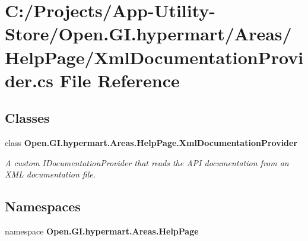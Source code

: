 \section{C\+:/\+Projects/\+App-\/\+Utility-\/\+Store/\+Open.G\+I.\+hypermart/\+Areas/\+Help\+Page/\+Xml\+Documentation\+Provider.cs File Reference}
\label{_xml_documentation_provider_8cs}
\subsection*{Classes}
\begin{DoxyCompactItemize}
\item 
class \textbf{ Open.\+G\+I.\+hypermart.\+Areas.\+Help\+Page.\+Xml\+Documentation\+Provider}
\begin{DoxyCompactList}\small\item\em A custom I\+Documentation\+Provider that reads the A\+PI documentation from an X\+ML documentation file. \end{DoxyCompactList}\end{DoxyCompactItemize}
\subsection*{Namespaces}
\begin{DoxyCompactItemize}
\item 
namespace \textbf{ Open.\+G\+I.\+hypermart.\+Areas.\+Help\+Page}
\end{DoxyCompactItemize}
